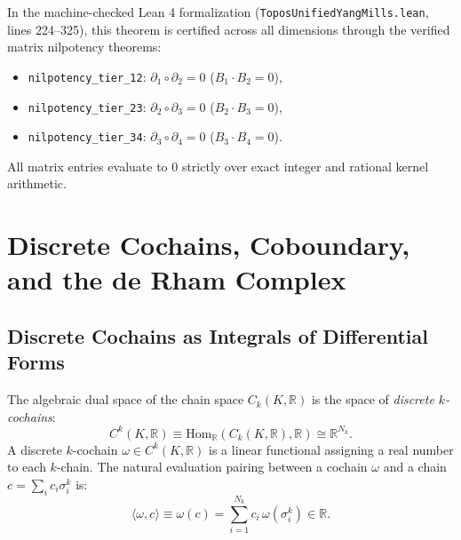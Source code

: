 In the machine-checked Lean 4 formalization (\texttt{ToposUnifiedYangMills.lean}, lines 224--325), this theorem is certified across all dimensions through the verified matrix nilpotency theorems:
\begin{itemize}
    \item \texttt{nilpotency\_tier\_12}: $\partial_1 \circ \partial_2 = 0$ ($B_1 \cdot B_2 = 0$),
    \item \texttt{nilpotency\_tier\_23}: $\partial_2 \circ \partial_3 = 0$ ($B_2 \cdot B_3 = 0$),
    \item \texttt{nilpotency\_tier\_34}: $\partial_3 \circ \partial_4 = 0$ ($B_3 \cdot B_4 = 0$).
\end{itemize}
All matrix entries evaluate to 0 strictly over exact integer and rational kernel arithmetic.

\section{Discrete Cochains, Coboundary, and the de Rham Complex}
\label{sec:discrete_derham}

\subsection{Discrete Cochains as Integrals of Differential Forms}
\label{subsec:cochains_as_integrals}

The algebraic dual space of the chain space $C_k(K, \mathbb{R})$ is the space of \emph{discrete $k$-cochains}:
\begin{equation}
\label{eq:cochain_space_def}
C^k(K, \mathbb{R}) \equiv \mathrm{Hom}_{\mathbb{R}}(C_k(K, \mathbb{R}), \mathbb{R}) \cong \mathbb{R}^{N_k}.
\end{equation}
A discrete $k$-cochain $\omega \in C^k(K, \mathbb{R})$ is a linear functional assigning a real number to each $k$-chain. The natural evaluation pairing between a cochain $\omega$ and a chain $c = \sum_i c_i \sigma_i^k$ is:
\begin{equation}
\label{eq:canonical_chain_cochain_pairing}
\langle \omega, c \rangle \equiv \omega(c) = \sum_{i=1}^{N_k} c_i \, \omega(\sigma_i^k) \in \mathbb{R}.
\end{equation}

